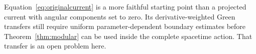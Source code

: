 Equation~\eqref{eq:originalcurrent} is a more faithful starting point than a projected current with angular components set to zero. Its derivative-weighted Green transfers still require uniform parameter-dependent boundary estimates before Theorem~\ref{thm:modular} can be used inside the complete spacetime action. That transfer is an open problem here.
